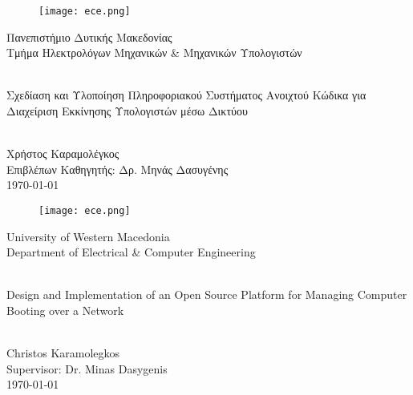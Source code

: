 \begin{titlepage}
	\begin{center}
		\begin{figure}[h]
			\centering \texttt{[image: ece.png]}
		\end{figure}
		{\LARGE Πανεπιστήμιο Δυτικής Μακεδονίας\\}
		{\Large Τμήμα Ηλεκτρολόγων Μηχανικών \& Μηχανικών Υπολογιστών}
		
		\begin{center}
			\vspace{2cm}
			
			\HRule \\[0.4cm]
			{\huge Σχεδίαση και Υλοποίηση Πληροφοριακού Συστήματος Ανοιχτού Κώδικα για Διαχείριση Εκκίνησης Υπολογιστών μέσω Δικτύου\\}
			\HRule \\[0.4cm]
		\end{center}
		
		\vfill
		\begin{doublespacing}
			
			{\LARGE 
				Χρήστος Καραμολέγκος\\}
			{\Large Επιβλέπων Καθηγητής: Δρ. Μηνάς Δασυγένης\\}
			\vfill 
			{\Large \today}
		\end{doublespacing}
	\end{center}
\end{titlepage}

\blankpage

\begin{titlepage}
	\begin{center}
		\begin{figure}[h]
			\centering \texttt{[image: ece.png]}
		\end{figure}
		{\LARGE University of Western Macedonia\\}
		{\Large Department of Electrical \& Computer Engineering}
		
		\begin{center}
			\vspace{2cm}
			
			\HRule \\[0.4cm]
			{\huge Design and Implementation of an Open Source Platform for Managing Computer Booting over a Network\\}
			\HRule \\[0.4cm]
		\end{center}
		
		\vfill
		\begin{doublespacing}
			
			{\LARGE 
				Christos Karamolegkos\\}
			{\Large Supervisor: Dr. Minas Dasygenis\\}
			\vfill
			{\Large \today}
		\end{doublespacing}
	\end{center}
\end{titlepage}
\afterpage{\blankpage}


